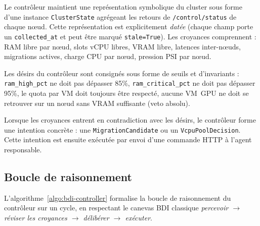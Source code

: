 \begin{description}[leftmargin=*, style=nextline]
    \item[Beliefs (croyances).] Le contrôleur maintient une représentation symbolique du cluster sous forme d'une instance \texttt{ClusterState} agrégeant les retours de \texttt{/control/status} de chaque nœud. Cette représentation est explicitement \emph{datée} (chaque champ porte un \texttt{collected\_at} et peut être marqué \texttt{stale=True}). Les croyances comprennent : RAM libre par nœud, slots vCPU libres, VRAM libre, latences inter-nœuds, migrations actives, charge CPU par nœud, pression PSI par nœud.
    \item[Desires (désirs).] Les désirs du contrôleur sont consignés sous forme de seuils et d'invariants : \texttt{ram\_high\_pct} ne doit pas dépasser 85\%, \texttt{ram\_critical\_pct} ne doit pas dépasser 95\%, le quota par VM doit toujours être respecté, aucune VM~GPU ne doit se retrouver sur un nœud sans VRAM suffisante (veto absolu).
    \item[Intentions (intentions).] Lorsque les croyances entrent en contradiction avec les désirs, le contrôleur forme une intention concrète : une \texttt{MigrationCandidate} ou un \texttt{VcpuPoolDecision}. Cette intention est ensuite exécutée par envoi d'une commande HTTP à l'agent responsable.
\end{description}

\subsection{Boucle de raisonnement}

L'algorithme~\ref{algo:bdi-controller} formalise la boucle de raisonnement du contrôleur sur un cycle, en respectant le canevas BDI classique \emph{percevoir $\to$ réviser les croyances $\to$ délibérer $\to$ exécuter}.

\begin{algorithm}[H]
\caption{Boucle BDI du \texttt{omega-controller}}
\label{algo:bdi-controller}
\end{algorithm}

